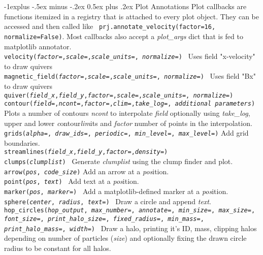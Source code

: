 \documentclass[10pt,landscape]{article}
\makeatletter
\renewcommand{\subsection}{\@startsection{subsection}{2}{0mm}%
                                {-1explus -.5ex minus -.2ex}%
                                {0.5ex plus .2ex}%
                                {\normalfont\normalsize\bfseries}}
\makeatother
\begin{document}
\begin{multicols}{3}
\subsection{Plot Annotations}
Plot callbacks are functions itemized in a registry that is attached to every plot object. They can be accessed and then called like \texttt{ prj.annotate\_velocity(factor=16, normalize=False)}. Most callbacks also accept a {\it plot\_args} dict that is fed to matplotlib annotator. \\
\texttt{velocity({\it factor=},{\it scale=},{\it scale\_units=}, {\it normalize=})} \textemdash\ Uses field "x-velocity" to draw quivers\\
\texttt{magnetic\_field({\it factor=},{\it scale=},{\it scale\_units=}, {\it normalize=})} \textemdash\ Uses field "Bx" to draw quivers\\
\texttt{quiver({\it field\_x},{\it field\_y},{\it factor=},{\it scale=},{\it scale\_units=}, {\it normalize=})} \\
\texttt{contour({\it field=},{\it ncont=},{\it factor=},{\it clim=},{\it take\_log=}, {\it additional parameters})} \textemdash Plots a number of contours {\it ncont} to interpolate {\it field} optionally using {\it take\_log}, upper and lower {\it c}ontour{\it lim}its and {\it factor} number of points in the interpolation.\\
\texttt{grids({\it alpha=}, {\it draw\_ids=}, {\it periodic=}, {\it min\_level=}, {\it max\_level=})} \textemdash Add grid boundaries. \\
\texttt{streamlines({\it field\_x},{\it field\_y},{\it factor=},{\it density=})}\\
\texttt{clumps({\it clumplist})} \textemdash\ Generate {\it clumplist} using the clump finder and plot. \\
\texttt{arrow({\it pos}, {\it code\_size})} Add an arrow at a {\it pos}ition. \\
\texttt{point({\it pos}, {\it text})} \textemdash\ Add text at a {\it pos}ition. \\
\texttt{marker({\it pos}, {\it marker=})} \textemdash\ Add a matplotlib-defined marker at a {\it pos}ition. \\
\texttt{sphere({\it center}, {\it radius}, {\it text=})} \textemdash\ Draw a circle and append {\it text}.\\
\texttt{hop\_circles({\it hop\_output}, {\it max\_number=}, {\it annotate=}, {\it min\_size=}, {\it max\_size=}, {\it font\_size=}, {\it print\_halo\_size=}, {\it fixed\_radius=}, {\it min\_mass=}, {\it print\_halo\_mass=}, {\it width=})} \textemdash\ Draw a halo, printing it's ID, mass, clipping halos depending on number of particles ({\it size}) and optionally fixing the drawn circle radius to be constant for all halos.\\

\end{multicols}
\end{document}
